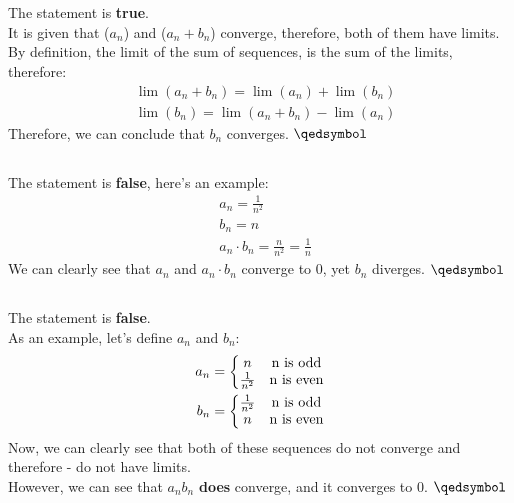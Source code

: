\documentclass[a4paper, 12pt]{article}
\newcommand{\sub}[1]{\subsection{\underline{#1}}}
\newcommand{\eq}[1]{\begin{align*}#1\end{align*}}
\renewcommand{\qed}{\hfill\(\qedsymbol\)}
\begin{document}
\section{}
\sub{}
The statement is \textbf{true}.\\
It is given that ($a_n$) and ($a_n+b_n$) converge, therefore, both of them have limits.\\
By definition, the limit of the sum of sequences, is the sum of the limits, therefore:
\eq{
    &\lim(a_n+b_n)=\lim(a_n)+\lim(b_n)\\
    &\lim(b_n)=\lim(a_n+b_n)-\lim(a_n)
}
Therefore, we can conclude that $b_n$ converges.
\qed
\sub{}
The statement is \textbf{false}, here's an example:
\eq{
    &a_n=\frac{1}{n^2}\\
    &b_n=n\\
    &a_n\cdot b_n=\frac{n}{n^2}=\frac{1}{n}
}
We can clearly see that $a_n$ and $a_n\cdot b_n$ converge to 0, yet $b_n$ diverges.
\qed
\sub{}
The statement is \textbf{false}.\\
As an example, let's define $a_n$ and $b_n$:
\eq{
    a_n=\bigg{\{}\begin{matrix}
        n & \text{n is odd}\\
        \frac{1}{n^2} & \text{n is even}\\
    \end{matrix}
    \\
    b_n=\bigg{\{}\begin{matrix}
        \frac{1}{n^2} & \text{n is odd}\\
        n & \text{n is even}\\
    \end{matrix}
}
Now, we can clearly see that both of these sequences do not converge and therefore - do not have limits.\\
However, we can see that $a_nb_n$ \textbf{does} converge, and it converges to $0$.
\qed
\pagebreak
\end{document}
